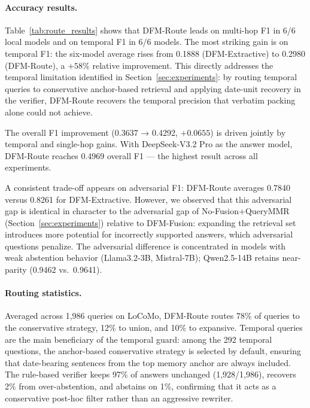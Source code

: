 \paragraph{Accuracy results.}
Table~\ref{tab:route_results} shows that DFM-Route leads on multi-hop F1 in 6/6 local models and on temporal F1 in 6/6 models.
The most striking gain is on temporal F1: the six-model average rises from 0.1888 (DFM-Extractive) to 0.2980 (DFM-Route), a $+58\%$ relative improvement.
This directly addresses the temporal limitation identified in Section~\ref{sec:experiments}: by routing temporal queries to conservative anchor-based retrieval and applying date-unit recovery in the verifier, DFM-Route recovers the temporal precision that verbatim packing alone could not achieve.

The overall F1 improvement (0.3637 → 0.4292, $+0.0655$) is driven jointly by temporal and single-hop gains.
With DeepSeek-V3.2 Pro as the answer model, DFM-Route reaches 0.4969 overall F1 --- the highest result across all experiments.

A consistent trade-off appears on adversarial F1: DFM-Route averages 0.7840 versus 0.8261 for DFM-Extractive.
However, we observed that this adversarial gap is identical in character to the adversarial gap of No-Fusion+QueryMMR (Section~\ref{sec:experiments}) relative to DFM-Fusion: expanding the retrieval set introduces more potential for incorrectly supported answers, which adversarial questions penalize.
The adversarial difference is concentrated in models with weak abstention behavior (Llama3.2-3B, Mistral-7B); Qwen2.5-14B retains near-parity (0.9462 vs.\ 0.9641).

\paragraph{Routing statistics.}
Averaged across 1,986 queries on LoCoMo, DFM-Route routes 78\% of queries to the conservative strategy, 12\% to union, and 10\% to expansive.
Temporal queries are the main beneficiary of the temporal guard: among the 292 temporal questions, the anchor-based conservative strategy is selected by default, ensuring that date-bearing sentences from the top memory anchor are always included.
The rule-based verifier keeps 97\% of answers unchanged (1,928/1,986), recovers 2\% from over-abstention, and abstains on 1\%, confirming that it acts as a conservative post-hoc filter rather than an aggressive rewriter.
